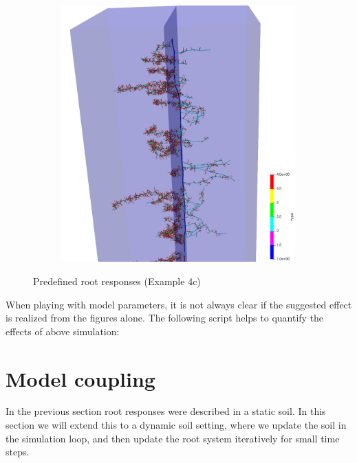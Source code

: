 \documentclass[a4paper]{article}
\begin{document}
\begin{figure}
\begin{subfigure}[c]{0.3\textwidth}
 \label{fig:insertion}
\end{subfigure}
\begin{subfigure}[c]{0.3\textwidth}
\includegraphics[width=0.99\textwidth]{example4c3.png}
 \label{fig:probability}
\end{subfigure}
\caption{Predefined root responses (Example 4c)}
\end{figure}

When playing with model parameters, it is not always clear if the suggested effect is realized from the figures alone. The following script helps to quantify the effects of above simulation: 





\section{Model coupling}

In the previous section root responses were described in a static soil. 
In this section we will extend this to a dynamic soil setting, where we update the soil in the simulation loop, and then update the root system iteratively for small time steps. 
\end{document}
